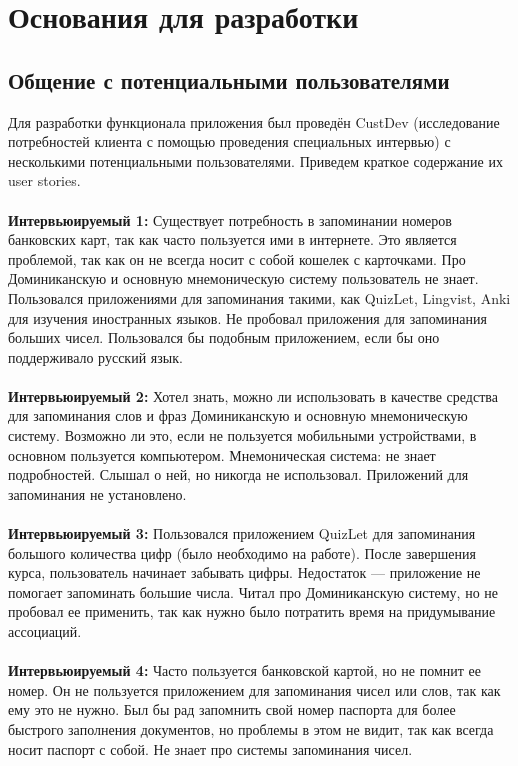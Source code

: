 \documentclass[draft]{article}
\begin{document}
\section {Основания для разработки}
\subsection{Общение с потенциальными пользователями}
Для разработки функционала приложения был проведён CustDev (исследование потребностей клиента с помощью проведения специальных интервью) с несколькими потенциальными пользователями. Приведем краткое содержание их user stories.\\
~\\
\textbf{Интервьюируемый 1:} Существует потребность в запоминании номеров банковских карт, так как часто пользуется ими в интернете. Это является проблемой, так как он не всегда носит с собой кошелек с карточками. Про Доминиканскую и основную мнемоническую систему пользователь не знает. Пользовался приложениями для запоминания такими, как QuizLet, Lingvist, Anki для изучения иностранных языков. Не пробовал приложения для запоминания больших чисел. Пользовался бы подобным приложением, если бы оно поддерживало русский язык.\\
~\\
\textbf{Интервьюируемый 2:} Хотел знать, можно ли использовать в качестве средства для запоминания слов и фраз Доминиканскую и основную мнемоническую систему. Возможно ли это, если не пользуется мобильными устройствами, в основном пользуется компьютером. Мнемоническая система: не знает подробностей. Слышал о ней, но никогда не использовал. Приложений для запоминания не установлено.\\
~\\
\textbf{Интервьюируемый 3:} Пользовался приложением QuizLet для запоминания большого количества цифр (было необходимо на работе). После завершения курса, пользователь начинает забывать цифры. Недостаток — приложение не помогает запоминать большие числа. Читал про Доминиканскую систему, но не пробовал ее применить, так как нужно было потратить время на придумывание ассоциаций.\\
~\\
\textbf{Интервьюируемый 4:} Часто пользуется банковской картой, но не помнит ее номер. Он не пользуется приложением для запоминания чисел или слов, так как ему это не нужно. Был бы рад запомнить свой номер паспорта для более быстрого заполнения документов, но проблемы в этом не видит, так как всегда носит паспорт с собой. Не знает про системы запоминания чисел.\\
\end{document}
